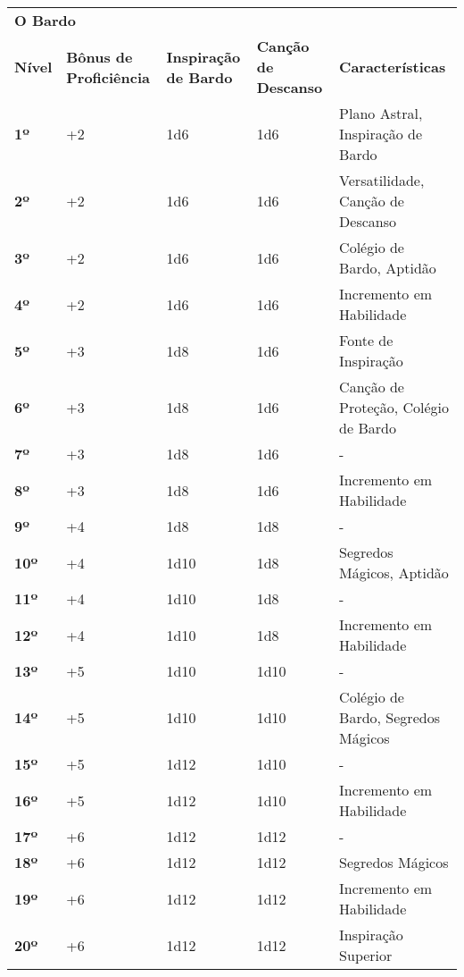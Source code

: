 \begin{center}
\begin{tabular}{
        | b{8mm}<{\centering}
        b{23mm}<{\centering}
        b{20mm}<{\centering}
        b{20mm}<{\centering}
        p{70mm}<{\raggedright\arraybackslash} |
}
    \hline

    \multicolumn{5}{|l|}{\textbf{\Large O Bardo}} \\

    \textbf{Nível} & \textbf{Bônus de Proficiência} & \textbf{Inspiração de
    Bardo} & \textbf{Canção de Descanso} & \textbf{Características} \\
    \hline \hline

    \textbf{1º} & +2 & 1d6 & 1d6 & Plano Astral, Inspiração de Bardo \\
    \hline
    \textbf{2º} & +2 & 1d6 & 1d6 & Versatilidade, Canção de Descanso \\
    \hline
    \textbf{3º} & +2 & 1d6 & 1d6 & Colégio de Bardo, Aptidão \\
    \hline
    \textbf{4º} & +2 & 1d6 & 1d6 & Incremento em Habilidade \\
    \hline
    \textbf{5º} & +3 & 1d8 & 1d6 & Fonte de Inspiração \\
    \hline
    \textbf{6º} & +3 & 1d8 & 1d6 & Canção de Proteção, Colégio de Bardo \\
    \hline
    \textbf{7º} & +3 & 1d8 & 1d6 &  - \\
    \hline
    \textbf{8º} & +3 & 1d8 & 1d6 & Incremento em Habilidade \\
    \hline
    \textbf{9º} & +4 & 1d8 & 1d8 & - \\
    \hline
    \textbf{10º} & +4 & 1d10 & 1d8 & Segredos Mágicos, Aptidão \\
    \hline
    \textbf{11º} & +4 & 1d10 & 1d8 & - \\
    \hline
    \textbf{12º} & +4 & 1d10 & 1d8 & Incremento em Habilidade \\
    \hline
    \textbf{13º} & +5 & 1d10 & 1d10 & - \\
    \hline
    \textbf{14º} & +5 & 1d10 & 1d10 & Colégio de Bardo, Segredos Mágicos \\
    \hline
    \textbf{15º} & +5 & 1d12 & 1d10 & - \\
    \hline
    \textbf{16º} & +5 & 1d12 & 1d10 & Incremento em Habilidade \\
    \hline
    \textbf{17º} & +6 & 1d12 & 1d12 & - \\
    \hline
    \textbf{18º} & +6 & 1d12 & 1d12 & Segredos Mágicos \\
    \hline
    \textbf{19º} & +6 & 1d12 & 1d12 & Incremento em Habilidade \\
    \hline
    \textbf{20º} & +6 & 1d12 & 1d12 & Inspiração Superior \\
    \hline
\end{tabular}
\end{center}
